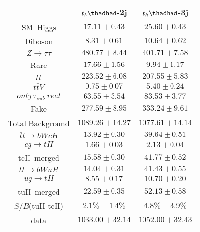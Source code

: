 \centering
\begin{tabular}{ccc}\toprule\toprule
 & $t_{h}\thadhad$-2j                      & $t_{h}\thadhad$-3j \\\midrule
SM~Higgs               &$17.11\pm0.43$               & $25.60\pm0.43$     \\
Diboson                &$8.31\pm0.61$                & $10.64\pm0.62$     \\
$Z\to\tau\tau$         &$480.77\pm8.44$              & $401.71\pm7.58$   \\
Rare                   &$17.66\pm1.56$               & $9.94\pm1.17$     \\
$t\bar{t}$             &$223.52\pm6.08$              & $207.55\pm5.83$    \\
$t\bar{t}V$            &$0.75\pm0.07$                & $5.40\pm0.24$      \\
$only~\tau_{sub}~real$ &$63.55\pm3.54$               & $83.53\pm3.77$     \\
Fake                   &$277.59\pm8.95$              & $333.24\pm9.61$    \\\midrule
Total Background       &$1089.26\pm14.27$            & $1077.61\pm14.14$  \\\midrule\midrule
$\bar{t}t\to bWcH$     &$13.92\pm0.30$               & $39.64\pm0.51$\\
$cg\to tH$             &$1.66\pm0.03$                & $2.13 \pm0.04$\\
tcH~merged             &$15.58\pm0.30$               & $41.77\pm0.52$\\\midrule
$\bar{t}t\to bWuH$     &$14.04\pm0.31$               & $41.43\pm0.55$\\
$ug\to tH$             &$8.55\pm0.17$                & $10.70\pm0.20$\\ 
tuH~merged             &$22.59\pm0.35$               & $52.13\pm0.58$\\   \midrule\midrule
 $S/B$(tuH-tcH)  & $2.1\%-1.4\%$ &$4.8\%-3.9\%$ \\\midrule\midrule
data                   &$1033.00\pm32.14$            & $1052.00\pm32.43$  \\
\bottomrule\bottomrule
\end{tabular}
